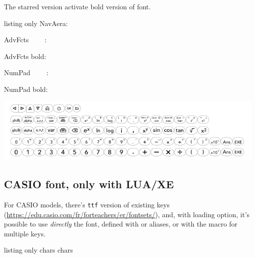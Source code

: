 \documentclass[11pt,a4paper]{ltxdoc}
\begin{document}
The starred version activate \textsf{bold} version of font.

\begin{DemoCode}{listing only}
NavAera: 

AdvFcts ~~~~: 

AdvFcts bold: 

NumPad ~~~~: 

NumPad bold: 
\end{DemoCode}

\begin{DemoCode}{}
\includegraphics{calculatoritems-nwks-lua.pdf}
\end{DemoCode}

\pagebreak

\subsection{CASIO font, only with LUA/XE}

For \textsf{CASIO} models, there's \texttt{ttf} version of existing keys (\url{https://edu.casio.com/fr/forteachers/er/fontsets/}), and, with \ShowCode{[xelua]} loading option, it's possible to use \textit{directly} the font, defined with  \ShowCode{\\fontkeyCASIOcw} or \ShowCode{\\fontkeyCASIOfx} aliases, or with the macro for multiple keys.

\begin{DemoCode}{listing only}
{\fontkeyCASIOcw chars}
{\fontkeyCASIOfx chars}

\end{DemoCode}
\end{document}
